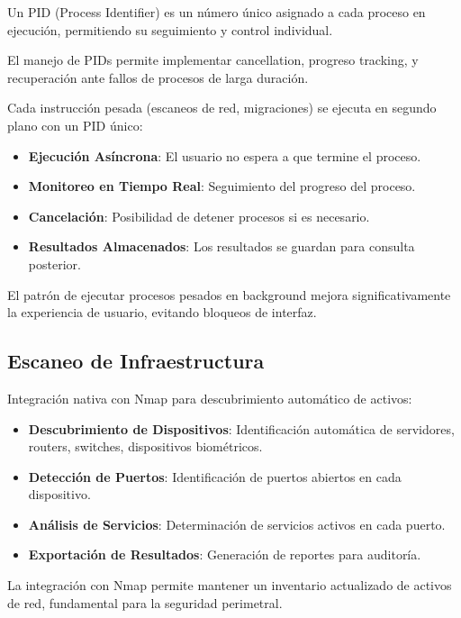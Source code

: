 Un PID (Process Identifier) es un número único asignado a cada proceso en ejecución, permitiendo su seguimiento y control individual.

El manejo de PIDs permite implementar cancellation, progreso tracking, y recuperación ante fallos de procesos de larga duración.

Cada instrucción pesada (escaneos de red, migraciones) se ejecuta en segundo plano con un PID único:

\begin{itemize}
\item \textbf{Ejecución Asíncrona}: El usuario no espera a que termine el proceso.
\item \textbf{Monitoreo en Tiempo Real}: Seguimiento del progreso del proceso.
\item \textbf{Cancelación}: Posibilidad de detener procesos si es necesario.
\item \textbf{Resultados Almacenados}: Los resultados se guardan para consulta posterior.
\end{itemize}

El patrón de ejecutar procesos pesados en background mejora significativamente la experiencia de usuario, evitando bloqueos de interfaz.

\subsection{Escaneo de Infraestructura}

Integración nativa con Nmap para descubrimiento automático de activos:

\begin{itemize}
\item \textbf{Descubrimiento de Dispositivos}: Identificación automática de servidores, routers, switches, dispositivos biométricos.
\item \textbf{Detección de Puertos}: Identificación de puertos abiertos en cada dispositivo.
\item \textbf{Análisis de Servicios}: Determinación de servicios activos en cada puerto.
\item \textbf{Exportación de Resultados}: Generación de reportes para auditoría.
\end{itemize}

La integración con Nmap permite mantener un inventario actualizado de activos de red, fundamental para la seguridad perimetral.

\clearpage
